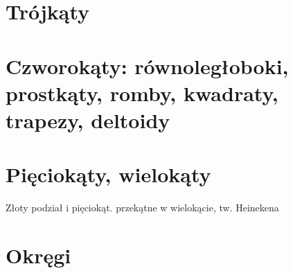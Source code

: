 
\section{Trójkąty}


\section{Czworokąty: równoległoboki, prostkąty, romby, kwadraty, trapezy, deltoidy}


\section{Pięciokąty, wielokąty}
Złoty podział i pięciokąt.
przekątne w wielokącie, tw. Heinekena %

\section{Okręgi}




